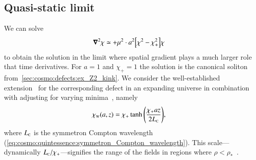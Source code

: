 
\subsection{Quasi-static limit}\label{sec:PT:symm_dws:quasi-static}
    We can solve
    \begin{equation}\label{eq:PT:symm_dws:eom_chi_quasistatic}
        \boldsymbol{\nabla}^2 \chi \simeq  +\mu^2 
         \cdot a^2{\left[  \chi^2 - \chi_+^2  \right]}\chi
    \end{equation}
    to obtain the solution in the limit where spatial gradient plays a much larger role that time derivatives. For $a=1$ and $\chi_+=1$ the solution is the canonical soliton from~\cref{sec:cosmo:defects:ex_Z2_kink}. 
    We consider the well-established extension~\citep[see e.g.][]{pressDynamicalEvolutionDomain1989} for the corresponding defect in an expanding universe in combination with adjusting for varying minima~\citep{llinaresDomainWallsCoupled2014}, namely
    \begin{equation}\label{eq:PT:symm_dws:chi_w_quasistatic_FLRW} 
        \chi_\mathrm{w}(a, z) = \chi_+ \tanh{{\left(  \frac{ \chi_+ az}{2L_{\text{\tiny{C}}}}   \right)}},
    \end{equation}
    where $L_{\text{\tiny{C}}}$ is the symmetron Compton wavelength (\cref{eq:cosmo:quintessence:symmetron_Compton_wavelength}). This scale---dynamically $L_{\text{\tiny{C}}}/\chi_+$---signifies the range of the fields in regions where $\rho < \rho_\ast$~\citep{perivolaropoulosGravitationalTransitionsExplicitly2022}. %

